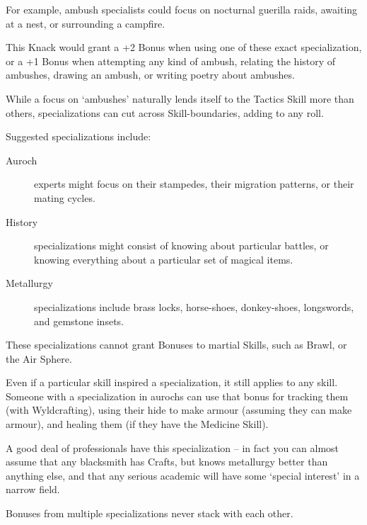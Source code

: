 \begin{multicols}{2}
For example, ambush specialists could focus on nocturnal guerilla raids, awaiting at a nest, or surrounding a campfire.

This Knack would grant a +2 Bonus when using one of these exact specialization, or a +1 Bonus when attempting any kind of ambush, relating the history of ambushes, drawing an ambush, or writing poetry about ambushes.

While a focus on `ambushes' naturally lends itself to the Tactics Skill more than others, specializations can cut across Skill-boundaries, adding to any roll.

Suggested specializations include:

\begin{description}
  \item[Auroch]
  experts might focus on their stampedes, their migration patterns, or their mating cycles.
  \item[History]
  specializations might consist of knowing about particular battles, or knowing everything about a particular set of magical items.
  \item[Metallurgy]
  specializations include brass locks, horse-shoes, donkey-shoes, longswords, and gemstone insets.
\end{description}

These specializations cannot grant Bonuses to martial Skills, such as Brawl, or the Air Sphere.

Even if a particular skill inspired a specialization, it still applies to any skill.
Someone with a specialization in aurochs can use that bonus for tracking them (with Wyldcrafting), using their hide to make armour (assuming they can make armour), and healing them (if they have the Medicine Skill).

A good deal of professionals have this specialization -- in fact you can almost assume that any blacksmith has Crafts, but knows metallurgy better than anything else, and that any serious academic will have some `special interest' in a narrow field.

Bonuses from multiple specializations never stack with each other.

\end{multicols}
